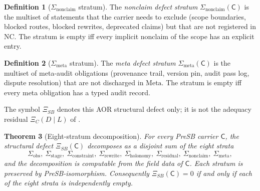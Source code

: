 \documentclass[11pt]{article}
\newcommand{\XiSB}{\Xi_{SB}}
\newcommand{\Sigobs}{\Sigma_{\mathrm{obs}}}
\newcommand{\Sigstage}{\Sigma_{\mathrm{stage}}}
\newcommand{\Sigconstr}{\Sigma_{\mathrm{constraint}}}
\newcommand{\Sigrewrite}{\Sigma_{\mathrm{rewrite}}}
\newcommand{\Sighol}{\Sigma_{\mathrm{holonomy}}}
\newcommand{\Sigres}{\Sigma_{\mathrm{residual}}}
\newcommand{\Signon}{\Sigma_{\mathrm{nonclaim}}}
\newcommand{\Sigmeta}{\Sigma_{\mathrm{meta}}}
\newtheorem{theorem}{Theorem}[section]
\theoremstyle{definition}
\newtheorem{definition}[theorem]{Definition}
\begin{document}
\begin{definition}[$\Signon$ stratum]\label{def:aor:sigma-nonclaim}
The \emph{nonclaim defect stratum} $\Signon(\mathsf C)$ is the
multiset of statements that the carrier needs to exclude (scope
boundaries, blocked routes, blocked rewrites, deprecated claims) but
that are not registered in $\mathrm{NC}$.  The stratum is empty iff
every implicit nonclaim of the scope has an explicit entry.
\end{definition}

\begin{definition}[$\Sigmeta$ stratum]\label{def:aor:sigma-meta}
The \emph{meta defect stratum} $\Sigmeta(\mathsf C)$ is the multiset
of meta-audit obligations (provenance trail, version pin, audit pass
log, dispute resolution) that are not discharged in $\mathrm{Meta}$.
The stratum is empty iff every meta obligation has a typed audit
record.
\end{definition}

The symbol \(\XiSB\) denotes this AOR structural defect only; it is not the
adequacy residual \(\Xi_C(D\mid L)\) of \citet{Tsiokos2026XiCompanion}.

\begin{theorem}[Eight-stratum decomposition]\label{thm:aor:eight-stratum-decomposition}
For every PreSB carrier $\mathsf C$, the structural defect
$\XiSB(\mathsf C)$ decomposes as a disjoint sum of the eight strata
\[
  \Sigobs,\ \Sigstage,\ \Sigconstr,\ \Sigrewrite,\ \Sighol,\ \Sigres,\ \Signon,\ \Sigmeta,
\]
and the decomposition is computable from the field data of
$\mathsf C$.  Each stratum is preserved by PreSB-isomorphism.
Consequently $\XiSB(\mathsf C)=0$ if and only if each of the eight
strata is independently empty.
\end{theorem}
\end{document}
